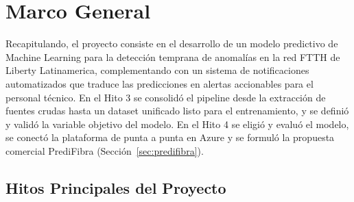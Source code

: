 \documentclass[12pt,a4paper]{article}
\begin{document}
\section{Marco General}
\noindent
Recapitulando, el proyecto consiste en el desarrollo de un modelo predictivo
de Machine Learning para la detección temprana de anomalías en la red FTTH de Liberty Latinamerica, complementando con
un sistema de notificaciones automatizados que traduce las predicciones en alertas accionables
para el personal técnico. En el Hito 3 se consolidó el pipeline desde la extracción de fuentes crudas
hasta un dataset unificado listo para el entrenamiento, y se definió y validó la variable objetivo del modelo. En el Hito 4 se eligió y evaluó el modelo, se conectó la plataforma de punta a punta en Azure y se formuló la propuesta comercial PrediFibra (Sección~\ref{sec:predifibra}).

\subsection{Hitos Principales del Proyecto}
\end{document}
